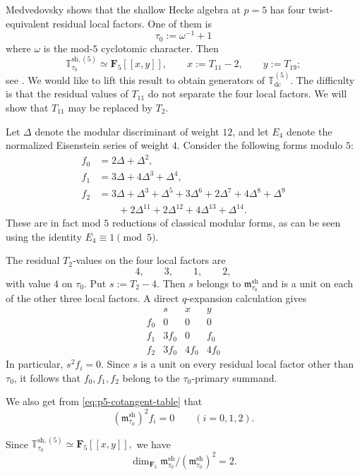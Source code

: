 \documentclass[11pt]{article}
\newcommand{\F}{\mathbf F}
\theoremstyle{plain}
\theoremstyle{definition}
\theoremstyle{remark}
\numberwithin{equation}{section}
\begin{document}
Medvedovsky shows that the shallow Hecke algebra at \(p=5\) has four
twist-equivalent residual local factors. One of them is \[\tau_0:=\omega^{-1}+1\] where $\omega$ is the mod-$5$ cyclotomic character. Then \[\mathbb T_{\tau_0}^{\mathrm{sh},(5)}\simeq\mathbf F_5[[x,y]],\qquad x:=T_{11}-2,\qquad y:=T_{19};\] see \cite[Theorem~8.1 and \S8.5]{Medvedovsky2015}. We would like to lift this result to obtain generators of \(\mathbb T_{\mathrm{dc}}^{(5)}\). The difficulty is that the residual
values of \(T_{11}\) do not separate the four local factors. We will show that \(T_{11}\) may be replaced by \(T_2\).

Let \(\Delta\) denote the modular discriminant of weight $12$, and let \(E_4\) denote the normalized Eisenstein series of weight \(4\). Consider the following forms modulo \(5\):
\[
\begin{aligned}
f_0&=2\Delta+\Delta^2,\\
f_1&=3\Delta+4\Delta^3+\Delta^4,\\
f_2&=3\Delta+\Delta^3+\Delta^5+3\Delta^6+2\Delta^7
      +4\Delta^8+\Delta^9\\
   &\qquad
      +2\Delta^{11}+2\Delta^{12}
      +4\Delta^{13}+\Delta^{14}.
\end{aligned}
\]
These are in fact mod $5$ reductions of classical modular forms, as can be seen using the identity \(E_4 \equiv 1 \pmod{5}\). 

The residual \(T_2\)-values on the four local factors are
\[
4,\qquad3,\qquad1,\qquad2,
\]
with value \(4\) on \(\tau_0\). Put \(s:=T_2-4.\) Then \(s\) belongs to \(\mathfrak m_{\tau_0}^{\mathrm{sh}}\) and is a unit on each of the other three local factors. A direct \(q\)-expansion calculation gives
\begin{equation}
\begin{array}{c|ccc}
 &s&x&y\\ \hline
f_0&0&0&0\\
f_1&3f_0&0&f_0\\
f_2&3f_0&4f_0&4f_0
\end{array}
\label{eq:p5-cotangent-table}
\end{equation}
In particular, \(s^2f_i=0\). Since \(s\) is a unit on every residual local factor other than \(\tau_0\), it follows that \(f_0,f_1,f_2\) belong to the \(\tau_0\)-primary summand.

We also get from \eqref{eq:p5-cotangent-table} that \[(\mathfrak m_{\tau_0}^{\mathrm{sh}})^2f_i=0 \qquad (i=0,1,2).\]

Since \(\mathbb T_{\tau_0}^{\mathrm{sh},(5)}\simeq\mathbf F_5[[x,y]],\) we have \[\dim_{\F_5}\mathfrak m_{\tau_0}^{\mathrm{sh}}/(\mathfrak m_{\tau_0}^{\mathrm{sh}})^2 = 2.\]
\end{document}
